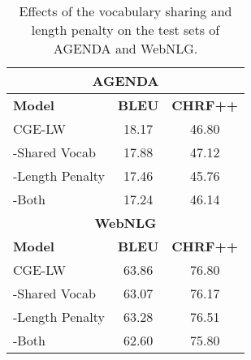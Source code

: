 \documentclass[11pt,a4paper]{article}
\begin{document}
\begin{table}[t]
\centering
{\renewcommand{\arraystretch}{0.8}
\setlength{\belowrulesep}{1.3pt}
\setlength{\aboverulesep}{0pt}
\begin{tabular}{@{\hspace*{5mm}}lcc@{\hspace*{5mm}}}  
\toprule
\multicolumn{3}{c}{\textbf{AGENDA}}  \\
\midrule
\textbf{Model} & \textbf{BLEU} & \textbf{CHRF++}  \\
\midrule
CGE-LW & 18.17 & 46.80 \\
 -Shared Vocab & 17.88 & 47.12 \\
 -Length Penalty & 17.46 & 45.76 \\
 -Both & 17.24 & 46.14 \\
 \midrule
\multicolumn{3}{c}{\textbf{WebNLG}}  \\
\midrule
\textbf{Model} & \textbf{BLEU} & \textbf{CHRF++}  \\
\midrule
CGE-LW & 63.86 & 76.80 \\
 -Shared Vocab & 63.07 & 76.17 \\
 -Length Penalty & 63.28 & 76.51 \\
 -Both & 62.60 & 75.80 \\
\bottomrule
\end{tabular}}
\vspace{-1.7mm}
\caption{Effects of the vocabulary sharing and length penalty on the test sets of AGENDA and WebNLG.}
\label{tab:ablation-test}
\end{table}
\end{document}
